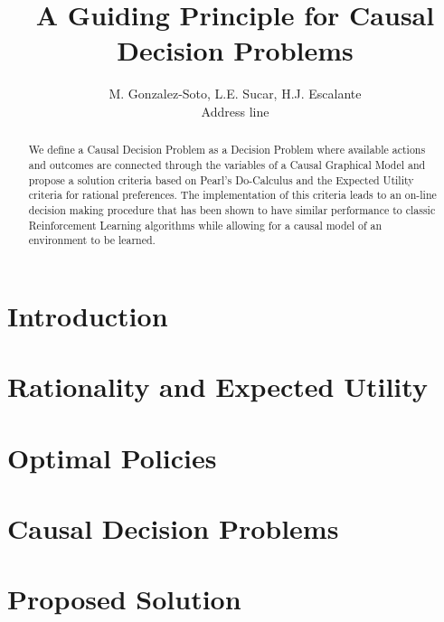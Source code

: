 \documentclass[letterpaper]{article} %
\title{A Guiding Principle for Causal Decision Problems}
\author{M. Gonzalez-Soto, L.E. Sucar, H.J. Escalante\\
Address line
}
\begin{document}
\maketitle
\begin{abstract}
We define a Causal Decision Problem as a Decision Problem where available actions and outcomes are connected through the variables of a Causal Graphical Model  and propose a solution criteria based on Pearl's Do-Calculus and the Expected Utility criteria for rational preferences. The implementation of this criteria leads to an on-line decision making procedure that has been shown to have similar performance to classic Reinforcement Learning algorithms while allowing for a causal model of an environment to be learned. 
\end{abstract}

\section{Introduction}
\noindent

\section{Rationality and Expected Utility}

\section{Optimal Policies}

\section{Causal Decision Problems}

\section{Proposed Solution}



\end{document}
